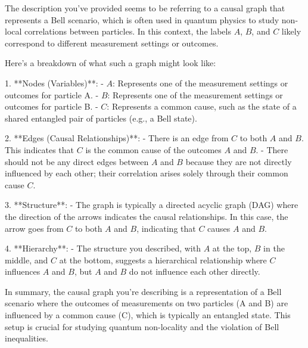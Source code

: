 The description you've provided seems to be referring to a causal graph that represents a Bell scenario, which is often used in quantum physics to study non-local correlations between particles. In this context, the labels \(A\), \(B\), and \(C\) likely correspond to different measurement settings or outcomes.

Here's a breakdown of what such a graph might look like:

1. **Nodes (Variables)**:
   - \(A\): Represents one of the measurement settings or outcomes for particle A.
   - \(B\): Represents one of the measurement settings or outcomes for particle B.
   - \(C\): Represents a common cause, such as the state of a shared entangled pair of particles (e.g., a Bell state).

2. **Edges (Causal Relationships)**:
   - There is an edge from \(C\) to both \(A\) and \(B\). This indicates that \(C\) is the common cause of the outcomes \(A\) and \(B\).
   - There should not be any direct edges between \(A\) and \(B\) because they are not directly influenced by each other; their correlation arises solely through their common cause \(C\).

3. **Structure**:
   - The graph is typically a directed acyclic graph (DAG) where the direction of the arrows indicates the causal relationships. In this case, the arrow goes from \(C\) to both \(A\) and \(B\), indicating that \(C\) causes \(A\) and \(B\).

4. **Hierarchy**:
   - The structure you described, with \(A\) at the top, \(B\) in the middle, and \(C\) at the bottom, suggests a hierarchical relationship where \(C\) influences \(A\) and \(B\), but \(A\) and \(B\) do not influence each other directly.

In summary, the causal graph you're describing is a representation of a Bell scenario where the outcomes of measurements on two particles (A and B) are influenced by a common cause (C), which is typically an entangled state. This setup is crucial for studying quantum non-locality and the violation of Bell inequalities.